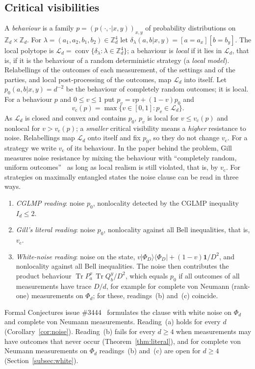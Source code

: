 \documentclass[11pt]{amsart}
\theoremstyle{definition}
\theoremstyle{remark}
\numberwithin{equation}{section}
\newcommand{\Z}{\mathbb{Z}}
\newcommand{\Tr}{\operatorname{Tr}}
\newcommand{\one}{\mathbf{1}}
\newcommand{\cL}{\mathcal{L}}
\newcommand{\vc}{v_{\mathrm c}}
\begin{document}
\subsection{Critical visibilities}\label{subsec:noisesetting}
A \emph{behaviour} is a family $p=(p(\cdot,\cdot|x,y))_{x,y}$ of probability distributions on $\Z_d\times\Z_d$. For
$\lambda=(a_1,a_2,b_1,b_2)\in\Z_d^4$ let $\delta_\lambda(a,b|x,y)=[a=a_x][b=b_y]$. The local polytope is
$\cL_d=\operatorname{conv}\{\delta_\lambda:\lambda\in\Z_d^4\}$; a behaviour is \emph{local} if it lies in $\cL_d$, that
is, if it is the behaviour of a random deterministic strategy (a \emph{local model}). Relabellings of the outcomes of
each measurement, of the settings and of the parties, and local post-processing of the outcomes, map $\cL_d$ into
itself. Let $p_0(a,b|x,y)=d^{-2}$ be the behaviour of completely random outcomes; it is local. For a behaviour $p$ and
$0\le v\le1$ put $p_v=vp+(1-v)p_0$ and
\[
\vc(p)=\max\{v\in[0,1]:p_v\in\cL_d\}.
\]
As $\cL_d$ is closed and convex and contains $p_0$, $p_v$ is local for $v\le\vc(p)$ and nonlocal for $v>\vc(p)$; a
\emph{smaller} critical visibility means a \emph{higher} resistance to noise. Relabellings map $\cL_d$ onto itself and
fix $p_0$, so they do not change $\vc$. For a strategy we write $\vc$ of its behaviour. In the paper behind the
problem, Gill measures noise resistance by mixing the behaviour with ``completely random, uniform
outcomes''~\cite[p.~140]{Gill} as long as local realism is still violated, that is, by $\vc$. For strategies on
maximally entangled states the noise clause can be read in three ways.
\begin{enumerate}
\item[(a)] \emph{CGLMP reading}: noise $p_0$, nonlocality detected by the CGLMP inequality $I_d\le2$.
\item[(b)] \emph{Gill's literal reading}: noise $p_0$, nonlocality against all Bell inequalities, that is, $\vc$.
\item[(c)] \emph{White-noise reading}: noise on the state, $v|\Phi_D\rangle\langle\Phi_D|+(1-v)\one/D^2$, and
nonlocality against all Bell inequalities. The noise then contributes the product behaviour
$\Tr P^x_a\,\Tr Q^y_b/D^2$, which equals $p_0$ if all outcomes of all measurements have trace $D/d$, for example for
complete von Neumann (rank-one) measurements on $\Phi_d$; for these, readings~(b) and~(c) coincide.
\end{enumerate}
Formal Conjectures issue \#3444~\cite{FC3444} formulates the clause with white noise on $\Phi_d$ and complete von Neumann
measurements. Reading~(a) holds for every $d$ (Corollary~\ref{cor:noise}). Reading~(b) fails for every $d\ge4$ when
measurements may have outcomes that never occur (Theorem~\ref{thm:literal}), and for complete von Neumann measurements on
$\Phi_d$ readings~(b) and~(c) are open for $d\ge4$ (Section~\ref{subsec:white}).
\end{document}
